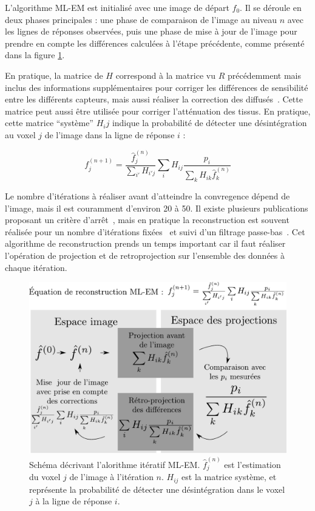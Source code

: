 L'algorithme ML-EM est initialisé avec une image de départ $f_0$. Il se déroule en deux phases principales : une phase de comparaison de l'image au niveau $n$ avec les lignes de réponses observées, puis une phase de mise à jour de l'image pour prendre en compte les différences calculées à l'étape précédente, comme présenté dans la figure \ref{fig:schemaMLEM}.

En pratique, la matrice de $H$ correspond à la matrice vu $R$ précédemment mais inclus des informations supplémentaires pour corriger les différences de sensibilité entre les différents capteurs, mais aussi réaliser la correction des diffusés~\cite{shepp1982maximum,chornoboy1990evaluation}. Cette matrice peut aussi être utilisée pour corriger l'atténuation des tissus. En pratique, cette matrice ``système'' $H_ij$ indique la probabilité de détecter une désintégration au voxel $j$ de l'image dans la ligne de réponse $i$ :

\begin{equation}
	f_j^{(n+1)}=\frac{\hat{f}_j^{(n)}}{\sum\limits_{i'}H_{i'j}}\sum\limits_{i}H_{ij}\frac{p_i}{\sum\limits_{k}H_{ik}\hat{f}_k^{(n)}}
\label{eq:MLEM}
\end{equation}


Le nombre d'itérations à réaliser avant d'atteindre la convregence dépend de l'image, mais il est couramment d'environ 20 à 50. Il existe plusieurs publications proposant un critère d'arrêt~\cite{bissantz2006multi}, mais en pratique la reconstruction est souvent réalisée pour un nombre d'itérations fixées~\cite{bailey2005positron} et  suivi d'un filtrage passe-bas~\cite{daube2001application}. Cet algorithme de reconstruction prends un temps important car il faut réaliser l'opération de projection et de retroprojection sur l'ensemble des données à chaque itération.

\begin{figure}
\centering
\includegraphics[width=12cm]{images/MLEM}
\caption[Schéma de principe de l'algorithme MLEM]{Schéma décrivant l'alorithme itératif ML-EM. $\hat{f}^{(n)}_j$ est l'estimation du voxel $j$ de l'image à l'itération $n$. $H_{ij}$ est la matrice système, et représente la probabilité de détecter une désintégration dans le voxel $j$ à la ligne de réponse $i$.}
\label{fig:schemaMLEM}
\end{figure}



